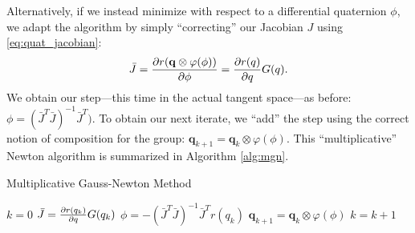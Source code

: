\documentclass[letterpaper, 10 pt, conference]{ieeeconf}  %
\newcommand{\q}{\textbf{q}}
\begin{document}
    Alternatively, if we instead minimize with respect to a differential quaternion $\phi$,
    we adapt the algorithm by simply ``correcting'' our Jacobian $J$ using 
    \eqref{eq:quat_jacobian}:
    \begin{equation} 
        \bar{J} = \pdv{r(\mathbf{q} \otimes \varphi(\phi))}{\phi} = \pdv{r(q)}{q} G(q).
    \end{equation}
    We obtain our step---this time in the actual tangent space---as before:
    $\phi = (\bar{J}^T \bar{J})^{-1} \bar{J}^T)$. To obtain our next iterate, we ``add'' the
    step using the correct notion of composition for the group: 
    $\q_{k+1} = \q_k \otimes \varphi(\phi)$. This ``multiplicative'' Newton algorithm is 
    summarized in Algorithm \ref{alg:mgn}.

    \begin{algorithm} 
    	\begin{algorithmic}[1]
    		\caption{Multiplicative Gauss-Newton Method}\label{alg:mgn}
    		\State $k = 0$
    		    \State $\bar{J} = \pdv{r(q_k)}{q} G(q_k)$ 
    		    \State $ \phi = -(\bar{J}^T \bar{J})^{-1} \bar{J}^T r(q_k)$ 
    		    \State $\q_{k+1} = \q_k \otimes \varphi(\phi)$ 
    		    \State $k = k + 1$
    		\EndWhile
    	\end{algorithmic}
    \end{algorithm}
\end{document}
